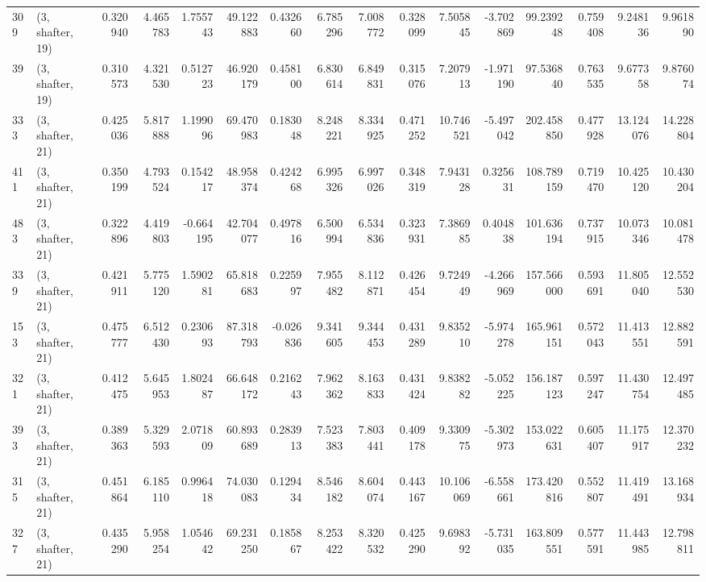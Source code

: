 \begin{tabular}{llrrrrrrrrrrrrrr}
309 &  (3, shafter, 19) &   0.320940 &   4.465783 &   1.755743 &    49.122883 &   0.432660 &   6.785296 &   7.008772 &  0.328099 &   7.505845 &  -3.702869 &    99.239248 &  0.759408 &   9.248136 &   9.961890 \\
39  &  (3, shafter, 19) &   0.310573 &   4.321530 &   0.512723 &    46.920179 &   0.458100 &   6.830614 &   6.849831 &  0.315076 &   7.207913 &  -1.971190 &    97.536840 &  0.763535 &   9.677358 &   9.876074 \\
333 &  (3, shafter, 21) &   0.425036 &   5.817888 &   1.199096 &    69.470983 &   0.183048 &   8.248221 &   8.334925 &  0.471252 &  10.746521 &  -5.497042 &   202.458850 &  0.477928 &  13.124076 &  14.228804 \\
411 &  (3, shafter, 21) &   0.350199 &   4.793524 &   0.154217 &    48.958374 &   0.424268 &   6.995326 &   6.997026 &  0.348319 &   7.943128 &   0.325631 &   108.789159 &  0.719470 &  10.425120 &  10.430204 \\
483 &  (3, shafter, 21) &   0.322896 &   4.419803 &  -0.664195 &    42.704077 &   0.497816 &   6.500994 &   6.534836 &  0.323931 &   7.386985 &   0.404838 &   101.636194 &  0.737915 &  10.073346 &  10.081478 \\
339 &  (3, shafter, 21) &   0.421911 &   5.775120 &   1.590281 &    65.818683 &   0.225997 &   7.955482 &   8.112871 &  0.426454 &   9.724949 &  -4.266969 &   157.566000 &  0.593691 &  11.805040 &  12.552530 \\
153 &  (3, shafter, 21) &   0.475777 &   6.512430 &   0.230693 &    87.318793 &  -0.026836 &   9.341605 &   9.344453 &  0.431289 &   9.835210 &  -5.974278 &   165.961151 &  0.572043 &  11.413551 &  12.882591 \\
321 &  (3, shafter, 21) &   0.412475 &   5.645953 &   1.802487 &    66.648172 &   0.216243 &   7.962362 &   8.163833 &  0.431424 &   9.838282 &  -5.052225 &   156.187123 &  0.597247 &  11.430754 &  12.497485 \\
393 &  (3, shafter, 21) &   0.389363 &   5.329593 &   2.071809 &    60.893689 &   0.283913 &   7.523383 &   7.803441 &  0.409178 &   9.330975 &  -5.302973 &   153.022631 &  0.605407 &  11.175917 &  12.370232 \\
315 &  (3, shafter, 21) &   0.451864 &   6.185110 &   0.996418 &    74.030083 &   0.129434 &   8.546182 &   8.604074 &  0.443167 &  10.106069 &  -6.558661 &   173.420816 &  0.552807 &  11.419491 &  13.168934 \\
327 &  (3, shafter, 21) &   0.435290 &   5.958254 &   1.054642 &    69.231250 &   0.185867 &   8.253422 &   8.320532 &  0.425290 &   9.698392 &  -5.731035 &   163.809551 &  0.577591 &  11.443985 &  12.798811 \\

\end{tabular}
